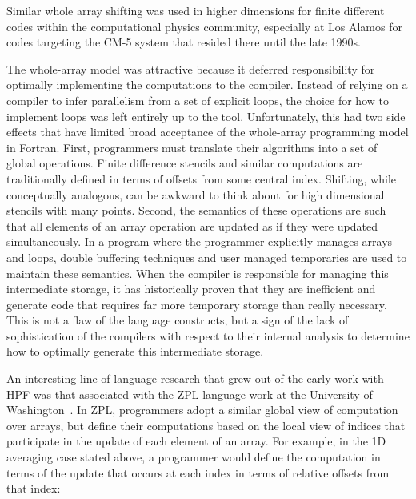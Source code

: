 Similar whole array shifting was used in higher dimensions for finite
different codes within the computational physics community, especially
at Los Alamos for codes targeting the CM-5 system that resided there until the
late 1990s.  

The whole-array model was attractive because it deferred
responsibility for optimally implementing the computations to the
compiler.  Instead of relying on a compiler to infer parallelism from
a set of explicit loops, the choice for how to implement loops was
left entirely up to the tool.  Unfortunately, this had two side
effects that have limited broad acceptance of the whole-array
programming model in Fortran.  First, programmers must translate their
algorithms into a set of global operations.  Finite difference
stencils and similar computations are traditionally defined in terms
of offsets from some central index.  Shifting, while conceptually
analogous, can be awkward to think about for high dimensional stencils
with many points.  Second, the semantics of these operations are such
that all elements of an array operation are updated as if they were
updated simultaneously.  In a program where the programmer explicitly
manages arrays and loops, double buffering techniques and user managed
temporaries are used to maintain these semantics.  When the compiler
is responsible for managing this intermediate storage, it has
historically proven that they are inefficient and generate code that
requires far more temporary storage than really necessary.  This is
not a flaw of the language constructs, but a sign of the lack of
sophistication of the compilers with respect to their internal
analysis to determine how to optimally generate this intermediate
storage.

An interesting line of language research that grew out of the early work
with HPF was that associated with the ZPL language work at the University
of Washington~\cite{chamberlain04zpl}.  In ZPL, programmers adopt a similar
global view of computation over arrays, but define their computations based
on the local view of indices that participate in the update of each element of
an array.  For example, in the 1D averaging case stated above, a programmer would
define the computation in terms of the update that occurs at each index in terms
of relative offsets from that index:
